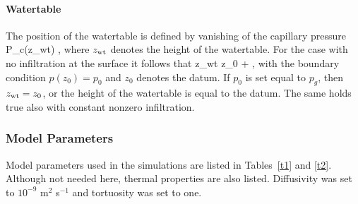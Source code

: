 \documentclass[12pt]{article}
\begin{document}
\paragraph{Watertable}

The position of the watertable is defined by vanishing of the capillary pressure
\EQ
P_c(z_{\rm wt}) ,
\EN
where $z_{\rm wt}$ denotes the height of the watertable. For the case with no infiltration at the surface it follows that
\EQ
z_{\rm wt} \eq z_0 + ,
\EN
with the boundary condition $p(z_0) = p_0$ and $z_0$ denotes the datum. If $p_0$ is set equal to $p_g$, then $z_{\rm wt} = z_0$, or the height of the watertable is equal to the datum.
The same holds true also with constant nonzero infiltration. 

\subsubsection{Model Parameters}

Model parameters used in the simulations are listed in Tables~\ref{t1} and \ref{t2}. Although not needed here, thermal properties are also listed. Diffusivity was set to $10^{-9}$ m$^2$ s$^{-1}$ and tortuosity was set to one.

\renewcommand{\tabcolsep}{1.7mm}
\end{document}
